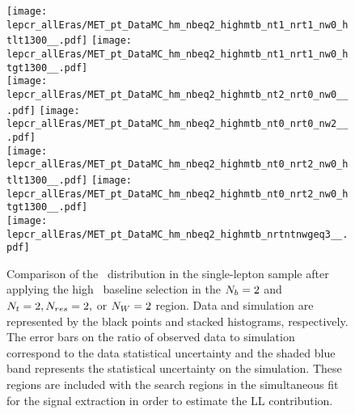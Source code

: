 \begin{figure}[!h]
	\begin{center}
  \texttt{[image: lepcr\_allEras/MET\_pt\_DataMC\_hm\_nbeq2\_highmtb\_nt1\_nrt1\_nw0\_htlt1300\_\_.pdf]}
  \texttt{[image: lepcr\_allEras/MET\_pt\_DataMC\_hm\_nbeq2\_highmtb\_nt1\_nrt1\_nw0\_htgt1300\_\_.pdf]} \\
  \texttt{[image: lepcr\_allEras/MET\_pt\_DataMC\_hm\_nbeq2\_highmtb\_nt2\_nrt0\_nw0\_\_.pdf]}
  \texttt{[image: lepcr\_allEras/MET\_pt\_DataMC\_hm\_nbeq2\_highmtb\_nt0\_nrt0\_nw2\_\_.pdf]} \\
  \texttt{[image: lepcr\_allEras/MET\_pt\_DataMC\_hm\_nbeq2\_highmtb\_nt0\_nrt2\_nw0\_htlt1300\_\_.pdf]}  
  \texttt{[image: lepcr\_allEras/MET\_pt\_DataMC\_hm\_nbeq2\_highmtb\_nt0\_nrt2\_nw0\_htgt1300\_\_.pdf]} \\
  \texttt{[image: lepcr\_allEras/MET\_pt\_DataMC\_hm\_nbeq2\_highmtb\_nrtntnwgeq3\_\_.pdf]} \\
	\end{center}
	\caption[Lost Lepton HM Control Region $\nb=2$ with 2 heavy objects]{Comparison of the \met~distribution in the single-lepton sample after applying the high \dm~baseline selection in the $\nb=2$ and $N_{t}=2, N_{res}=2,$ or $N_{W}=2$ region. Data and simulation are represented by the black points and stacked histograms, respectively. The error bars on the ratio of observed data to simulation correspond to the data statistical uncertainty and the shaded blue band represents the statistical uncertainty on the simulation. These regions are included with the search regions in the simultaneous fit for the signal extraction in order to estimate the LL contribution.
	 }
	\label{fig:llb-1lcr-datavsmc-hm-nb2-2}
\end{figure}

